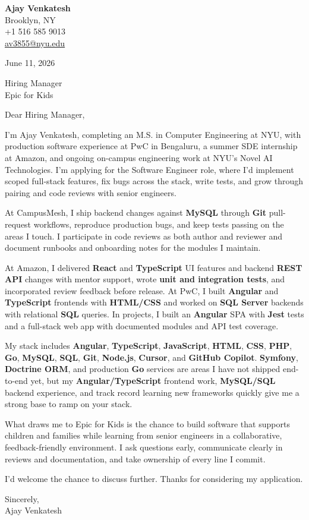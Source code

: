 \documentclass[letterpaper,11pt]{article}
\begin{document}
\begin{flushleft}
\textbf{\large Ajay Venkatesh} \\
Brooklyn, NY \\
+1 516 585 9013 \\
\href{mailto:av3855@nyu.edu}{av3855@nyu.edu}
\end{flushleft}
\vspace{10pt}
June 11, 2026
\vspace{6pt}

Hiring Manager \\
Epic for Kids

\vspace{10pt}

Dear Hiring Manager,

I'm Ajay Venkatesh, completing an M.S. in Computer Engineering at NYU, with production software experience at PwC in Bengaluru, a summer SDE internship at Amazon, and ongoing on-campus engineering work at NYU's Novel AI Technologies. I'm applying for the Software Engineer role, where I'd implement scoped full-stack features, fix bugs across the stack, write tests, and grow through pairing and code reviews with senior engineers.

At CampusMesh, I ship backend changes against \textbf{MySQL} through \textbf{Git} pull-request workflows, reproduce production bugs, and keep tests passing on the areas I touch. I participate in code reviews as both author and reviewer and document runbooks and onboarding notes for the modules I maintain.

At Amazon, I delivered \textbf{React} and \textbf{TypeScript} UI features and backend \textbf{REST API} changes with mentor support, wrote \textbf{unit and integration tests}, and incorporated review feedback before release. At PwC, I built \textbf{Angular} and \textbf{TypeScript} frontends with \textbf{HTML/CSS} and worked on \textbf{SQL Server} backends with relational \textbf{SQL} queries. In projects, I built an \textbf{Angular} SPA with \textbf{Jest} tests and a full-stack web app with documented modules and API test coverage.

My stack includes \textbf{Angular}, \textbf{TypeScript}, \textbf{JavaScript}, \textbf{HTML}, \textbf{CSS}, \textbf{PHP}, \textbf{Go}, \textbf{MySQL}, \textbf{SQL}, \textbf{Git}, \textbf{Node.js}, \textbf{Cursor}, and \textbf{GitHub Copilot}. \textbf{Symfony}, \textbf{Doctrine ORM}, and production \textbf{Go} services are areas I have not shipped end-to-end yet, but my \textbf{Angular/TypeScript} frontend work, \textbf{MySQL/SQL} backend experience, and track record learning new frameworks quickly give me a strong base to ramp on your stack.

What draws me to Epic for Kids is the chance to build software that supports children and families while learning from senior engineers in a collaborative, feedback-friendly environment. I ask questions early, communicate clearly in reviews and documentation, and take ownership of every line I commit.

I'd welcome the chance to discuss further. Thanks for considering my application.

\vspace{12pt}
Sincerely, \\
Ajay Venkatesh
\end{document}
